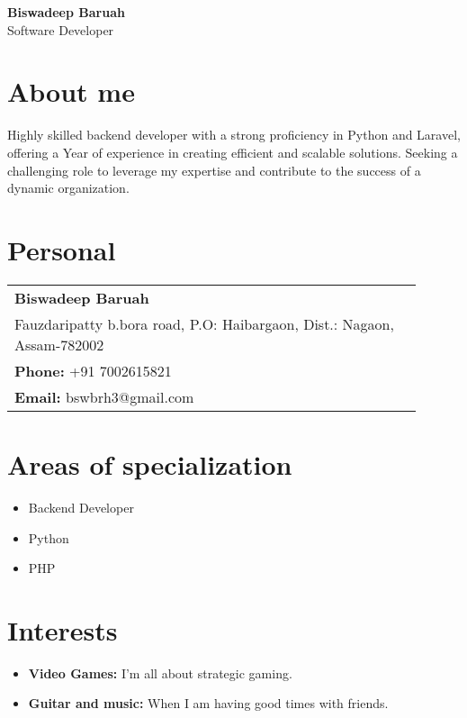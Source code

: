 \documentclass[10pt,a4paper]{article}
\begin{document}
\pagestyle{empty}

\begin{center}
    {\Huge \textbf{Biswadeep Baruah}} \\
    \vspace{2mm}
    {\Large \color{titlegrey} Software Developer}
\end{center}
\vspace{5mm}

\begin{paracol}{2}
\begin{leftcolumn}

\section*{About me}
\textcolor{textgrey}{
Highly skilled backend developer with a strong proficiency in Python and Laravel, offering a Year of experience in creating efficient and scalable solutions. Seeking a challenging role to leverage my expertise and contribute to the success of a dynamic organization.
}

\section*{Personal}
\textcolor{textgrey}{
\begin{tabular}{@{}p{0.9\linewidth}}
    \textbf{Biswadeep Baruah} \\
    Fauzdaripatty b.bora road, P.O: Haibargaon, Dist.: Nagaon, Assam-782002 \\
    \textbf{Phone:} +91 7002615821 \\
    \textbf{Email:} bswbrh3@gmail.com \\
\end{tabular}
}

\section*{Areas of specialization}
\textcolor{textgrey}{
\begin{itemize}
    \item Backend Developer
    \item Python
    \item PHP
\end{itemize}
}

\section*{Interests}
\textcolor{textgrey}{
\begin{itemize}
    \item \textbf{Video Games:} I’m all about strategic gaming.
    \item \textbf{Guitar and music:} When I am having good times with friends.
\end{itemize}
}


\end{leftcolumn}
\end{paracol}
\end{document}
